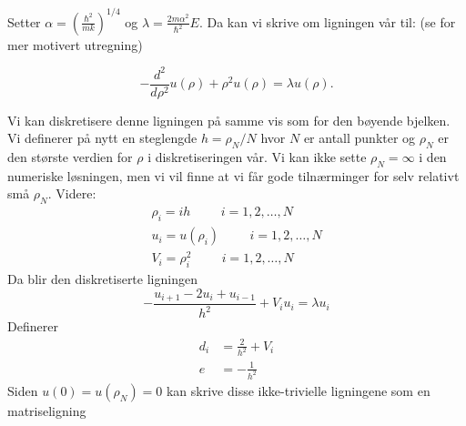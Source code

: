 \documentclass[reprint,english,notitlepage]{revtex4-1}
\begin{document}
	Setter $\alpha = \left(\frac{\hbar^2}{mk}\right)^{1/4}$ og $\lambda = \frac{2m\alpha^2}{\hbar^2}E$. Da kan vi skrive om ligningen vår til: (se \cite{oppgavetekst} for mer motivert utregning)
	
	\begin{equation*}
	-\frac{d^2}{d\rho^2} u(\rho) + \rho^2u(\rho)  = \lambda u(\rho) .
	\end{equation*}
	
	Vi kan diskretisere denne ligningen på samme vis som for den bøyende bjelken. Vi definerer på nytt en steglengde $h = \rho_N / N$ hvor $N$ er antall punkter og $\rho_N$ er den største verdien for $\rho$ i diskretiseringen vår. Vi kan ikke sette $\rho_N = \infty$ i den numeriske løsningen, men vi vil finne at vi får gode tilnærminger for selv relativt små $\rho_N$. Videre:
	\begin{equation*}
	\begin{aligned}
	\rho_i = ih \hspace{1cm} i=1,2,\dots , N \\
	u_i = u(\rho_i) \hspace{1cm} i=1,2,\dots , N \\
	V_i = \rho_i^2 \hspace{1cm} i=1,2,\dots , N
	\end{aligned}
	\end{equation*}
	Da blir den diskretiserte ligningen
	\begin{equation*}
	-\frac{u_{i+1} -2u_i +u_{i-1} }{h^2}+V_iu_i  = \lambda u_i
	\end{equation*}
	Definerer
	\begin{equation*}
	\begin{aligned}
	d_i&=\frac{2}{h^2}+V_i \\
	e &= -\frac{1}{h^2}
	\end{aligned}
	\end{equation*}
	Siden $u(0) = u(\rho_N) = 0$ kan skrive disse ikke-trivielle ligningene som en matriseligning
\end{document}
